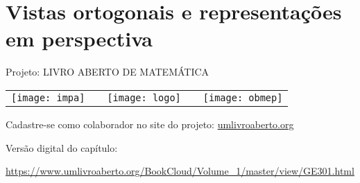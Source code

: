 \ifnum{}
\renewcommand\chapterillustration{abertura-perspectiva2}
\else
\renewcommand\chapterillustration{abertura-perspectiva2-professor}
\fi

\renewcommand\chapterwhat{Representações em Matemática (semiótica): exemplos, spectos cognitivos e culturais; projeções em perspectiva: conceitualização via definição 3D, propriedades com justificativas, aplicações (pinturas, ilusões de ótica); projeções paralelas: conceitualização, propriedades e aplicações (planta baixa, mapa de fuga, vistas e ilustrações em áreas diversas).}

\renewcommand\chapterbecause{As projeções em perspectiva fornecem um modelo matemático que auxilia na compreensão de como vemos, comunicamos e interagimos com o mundo. Já as projeções paralelas fornecem uma representação mais simples e fácil de se entender e, assim, elas têm sido utilizadas para a confecção de ilustrações em várias áreas: Arquitetura, Engenharia, Biologia, etc. Além disso, no dia a dia, é importante, por exemplo, saber interpretar diagramas 2D de objetos 3D que descrevem como montar uma cama, colocar um cartucho em uma impressora, abrir a porta de emergência do aviã o, descobrir a saída de emergência mais próxima em um hotel, etc.}

\chapter{Vistas ortogonais e representações em perspectiva}
\label{\detokenize{GE301::doc}}\label{\detokenize{GE301:vistas-ortogonais-e-representacoes-em-perspectiva}}

\mbox{}\thispagestyle{empty}\clearpage

\thispagestyle{empty}

\begin{center}
Projeto: LIVRO ABERTO DE MATEMÁTICA

\noindent \begin{tabular}{lcccr}
\texttt{[image: impa]}& \quad\quad& \texttt{[image: logo]} & \quad\quad& \texttt{[image: obmep]} 
\end{tabular}
\end{center}

\vspace*{.3cm}

Cadastre-se como colaborador no site do projeto: \url{umlivroaberto.org}

Versão digital do capítulo:

\url{https://www.umlivroaberto.org/BookCloud/Volume_1/master/view/GE301.html}


